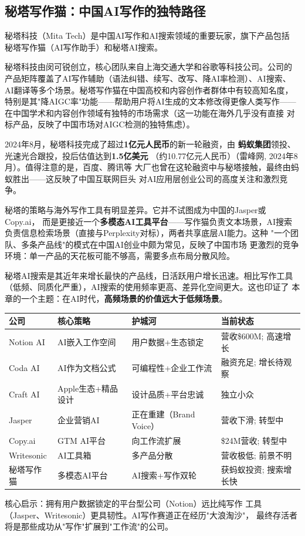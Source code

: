 \subsection{秘塔写作猫：中国AI写作的独特路径}
\label{subsec:mita}

秘塔科技（Mita Tech）是中国AI写作和AI搜索领域的重要玩家，旗下产品包括
秘塔写作猫（AI写作助手）和秘塔AI搜索。

秘塔科技由闵可锐创立，核心团队来自上海交通大学和谷歌等科技公司。公司的
产品矩阵覆盖了AI写作辅助（语法纠错、续写、改写、降AI率检测）、AI搜索、
AI翻译等多个场景。秘塔写作猫在中国高校和内容创作者群体中有较高知名度，
特别是其"降AIGC率"功能——帮助用户将AI生成的文本修改得更像人类写作——
在中国学术和内容创作领域有独特的市场需求（这一功能在海外几乎没有直接
对标产品，反映了中国市场对AIGC检测的独特焦虑）。

2024年8月，秘塔科技完成了超过\textbf{1亿元人民币}的新一轮融资，由
\textbf{蚂蚁集团}领投、光速光合跟投，投后估值达到\textbf{1.5亿美元}
（约10.77亿元人民币）（雷峰网, 2024年8月）。值得注意的是，百度、腾讯等
大厂也曾在这轮融资中与秘塔接触，最终由蚂蚁胜出——这反映了中国互联网巨头
对AI应用层创业公司的高度关注和激烈竞争。

秘塔的策略与海外写作工具有明显差异。它并不试图成为中国的Jasper或Copy.ai，
而是更接近一个\textbf{多模态AI工具平台}——写作猫负责文本场景，AI搜索
负责信息检索场景（直接与Perplexity对标），两者共享底层AI能力。这种
"一个团队、多条产品线"的模式在中国AI创业中颇为常见，反映了中国市场
更激烈的竞争环境：单一产品的天花板可能不够高，需要多点布局分散风险。

秘塔AI搜索是其近年来增长最快的产品线，日活跃用户增长迅速。相比写作工具
（低频、同质化严重），AI搜索的使用频率更高、差异化空间更大。这也印证了
本章的一个主题：在AI时代，\textbf{高频场景的价值远大于低频场景}。

\begin{keybox}
\small
\begin{tabularx}{\textwidth}{l X X X}
\toprule
\rowcolor{figLightGray}
\textbf{公司} & \textbf{核心策略} & \textbf{护城河} & \textbf{当前状态} \\
\midrule
Notion AI & AI嵌入工作空间 & 用户数据+生态锁定 & 营收\$600M; 高速增长 \\
Coda AI & AI作为文档公式 & 可编程性+企业工作流 & 融资充足; 增长待观察 \\
Craft AI & Apple生态+精品设计 & 设计品质+平台忠诚 & 独立小众 \\
Jasper & 企业营销AI & 正在重建（Brand Voice）& 营收下滑; 转型中 \\
Copy.ai & GTM AI平台 & 向工作流扩展 & \$24M营收; 转型中 \\
Writesonic & AI工具箱 & 多产品分散 & 营收极低; 前景不明 \\
秘塔写作猫 & 多模态AI平台 & AI搜索+写作双轮 & 获蚂蚁投资; 搜索增长快 \\
\bottomrule
\end{tabularx}

\medskip
\noindent 核心启示：拥有用户数据锁定的平台型公司（Notion）远比纯写作
工具（Jasper、Writesonic）更具韧性。AI写作赛道正在经历"大浪淘沙"，
最终存活者将是那些成功从"写作"扩展到"工作流"的公司。
\end{keybox}

